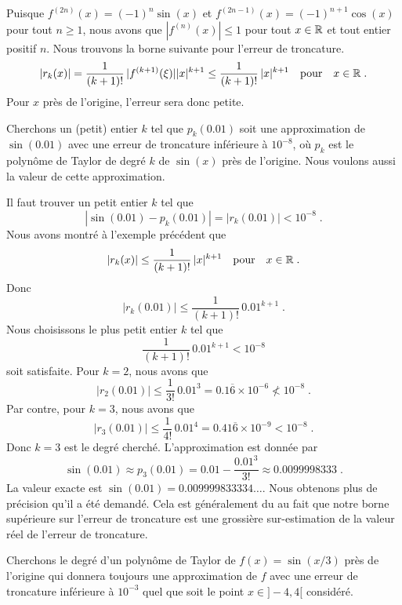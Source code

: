 {\begin{egg}
Puisque $f^{(2n)}(x) = (-1)^n \sin(x)$ et
$f^{(2n-1)}(x) = (-1)^{n+1} \cos(x)$
pour tout $n\geq 1$, nous avons que $\left|f^{(n)}(x)\right|\leq 1$ pour
tout $x \in \mathbb{R}$ et tout entier positif $n$.  Nous trouvons la borne
suivante pour l'erreur de troncature.
\[
|r_k(x)| = \frac{1}{(k+1)!}\, |f^{(k+1)}(\xi)| |x|^{k+1}
\leq \frac{1}{(k+1)!} \, |x|^{k+1} \quad \text{pour} \quad  x \in \mathbb{R} \; .
\]
Pour $x$ près de l'origine, l'erreur sera donc petite.
\end{egg}


\begin{egg}[\eng]
Cherchons un (petit) entier $k$ tel que $p_k(0.01)$ soit une
approximation de $\sin(0.01)$ avec une erreur de troncature inférieure
à $10^{-8}$, où $p_k$ est le polynôme de Taylor de degré $k$ de
$\sin(x)$ près de l'origine.  Nous voulons aussi la valeur de cette
approximation.

Il faut trouver un petit entier $k$ tel que
\[
\left| \sin(0.01) - p_k(0.01) \right| = \left|r_k(0.01)\right| <
10^{-8} \; .
\]
Nous avons montré à l'exemple précédent que
\[
|r_k(x)| \leq \frac{1}{(k+1)!} \, |x|^{k+1} \quad \text{pour}
\quad  x \in \mathbb{R} \; .
\]
Donc
\[
|r_k(0.01)| \leq \frac{1}{(k+1)!} \, 0.01^{k+1} \; .
\]
Nous choisissons le plus petit entier $k$ tel que
\[
\frac{1}{(k+1)!} \, 0.01^{k+1} < 10^{-8}
\]
soit satisfaite.  Pour $k=2$, nous avons que
\[
|r_2(0.01)| \leq \frac{1}{3!} \, 0.01^3
= 0.1\overline{6} \times 10^{-6} \not< 10^{-8} \; .
\]
Par contre, pour $k=3$, nous avons que
\[
|r_3(0.01)| \leq \frac{1}{4!} \, 0.01^4
= 0.41\overline{6} \times 10^{-9} < 10^{-8} \; .
\]
Donc $k=3$ est le degré cherché.  L'approximation est donnée par
\[
\sin(0.01) \approx p_3(0.01) = 0.01 - \frac{0.01^3}{3!} \approx
0.0099998333 \; .
\]
La valeur exacte est $\sin(0.01) = 0.009999833334\ldots$.  Nous
obtenons plus de précision qu'il a été demandé.  Cela est
généralement du au fait que notre borne supérieure sur l'erreur de
troncature est une grossière sur-estimation de la valeur réel de
l'erreur de troncature.
\end{egg}

\begin{egg}[\eng]
Cherchons le degré d'un polynôme de Taylor de
$f(x) = \sin\left(x/3\right)$ près de l'origine qui donnera toujours
une approximation de $f$ avec une erreur de troncature inférieure à
$10^{-3}$ quel que soit le point $x\in ]-4,4[$ considéré.


\end{egg}}
